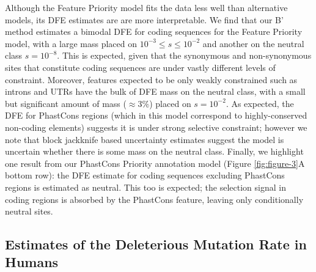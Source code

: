 \documentclass[11pt]{article}
\begin{document}
Although the Feature Priority model fits the data less well than alternative
models, its DFE estimates are are more interpretable. We find that our B'
method estimates a bimodal DFE for coding sequences for the Feature Priority
model, with a large mass placed on $10^{-3} \le s \le 10^{-2}$ and another on
the neutral class $s=10^{-8}$. This is expected, given that the synonymous and
non-synonymous sites that constitute coding sequences are under vastly
different levels of constraint. Moreover, features expected to be only weakly
constrained such as introns and UTRs have the bulk of DFE mass on the neutral
class, with a small but significant amount of mass ($\approx 3\%$) placed on
$s=10^{-2}$. As expected, the DFE for PhastCons regions (which in this model
correspond to highly-conserved non-coding elements) suggests it is under strong
selective constraint; however we note that block jackknife based uncertainty
estimates suggest the model is uncertain whether there is some mass on the
neutral class. Finally, we highlight one result from our PhastCons Priority
annotation model (Figure \ref{fig:figure-3}A bottom row): the DFE estimate for
coding sequences excluding PhastCons regions is estimated as neutral. This too
is expected; the selection signal in coding regions is absorbed by the
PhastCons feature, leaving only conditionally neutral sites.

\subsection*{Estimates of the Deleterious Mutation Rate in Humans}
\end{document}
